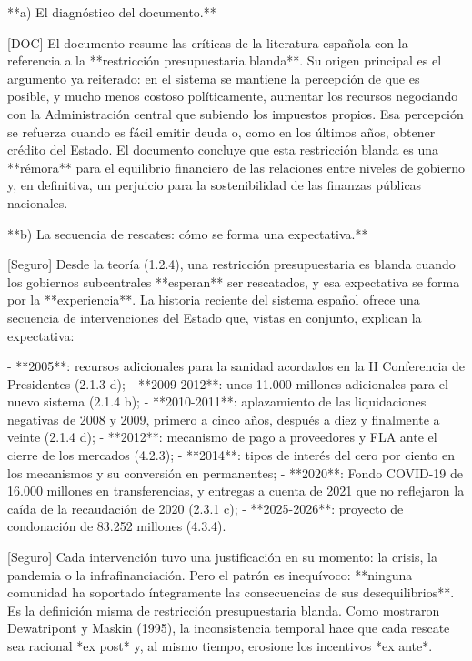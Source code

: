 \documentclass[10pt,a4paper]{article}
\begin{document}
**a) El diagnóstico del documento.**

[DOC] El documento resume las críticas de la literatura española con la referencia a la **restricción presupuestaria blanda**. Su origen principal es el argumento ya reiterado: en el sistema se mantiene la percepción de que es posible, y mucho menos costoso políticamente, aumentar los recursos negociando con la Administración central que subiendo los impuestos propios. Esa percepción se refuerza cuando es fácil emitir deuda o, como en los últimos años, obtener crédito del Estado. El documento concluye que esta restricción blanda es una **rémora** para el equilibrio financiero de las relaciones entre niveles de gobierno y, en definitiva, un perjuicio para la sostenibilidad de las finanzas públicas nacionales.

**b) La secuencia de rescates: cómo se forma una expectativa.**

[Seguro] Desde la teoría (1.2.4), una restricción presupuestaria es blanda cuando los gobiernos subcentrales **esperan** ser rescatados, y esa expectativa se forma por la **experiencia**. La historia reciente del sistema español ofrece una secuencia de intervenciones del Estado que, vistas en conjunto, explican la expectativa:

- **2005**: recursos adicionales para la sanidad acordados en la II Conferencia de Presidentes (2.1.3 d);
- **2009-2012**: unos 11.000 millones adicionales para el nuevo sistema (2.1.4 b);
- **2010-2011**: aplazamiento de las liquidaciones negativas de 2008 y 2009, primero a cinco años, después a diez y finalmente a veinte (2.1.4 d);
- **2012**: mecanismo de pago a proveedores y FLA ante el cierre de los mercados (4.2.3);
- **2014**: tipos de interés del cero por ciento en los mecanismos y su conversión en permanentes;
- **2020**: Fondo COVID-19 de 16.000 millones en transferencias, y entregas a cuenta de 2021 que no reflejaron la caída de la recaudación de 2020 (2.3.1 c);
- **2025-2026**: proyecto de condonación de 83.252 millones (4.3.4).

[Seguro] Cada intervención tuvo una justificación en su momento: la crisis, la pandemia o la infrafinanciación. Pero el patrón es inequívoco: **ninguna comunidad ha soportado íntegramente las consecuencias de sus desequilibrios**. Es la definición misma de restricción presupuestaria blanda. Como mostraron Dewatripont y Maskin (1995), la inconsistencia temporal hace que cada rescate sea racional *ex post* y, al mismo tiempo, erosione los incentivos *ex ante*.
\end{document}

